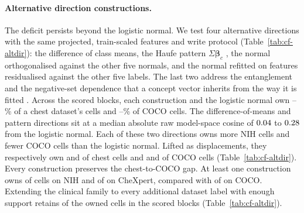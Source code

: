 \paragraph{Alternative direction constructions.} The deficit persists beyond the logistic normal. We test four alternative directions with the same projected, train-scaled features and write protocol (Table~\ref{tab:cf-altdir}): the difference of class means, the Haufe pattern $\Sigma\boldsymbol\beta_c$ \citep{haufe2014interpretation}, the normal orthogonalised against the other five normals, and the normal refitted on features residualised against the other five labels. The last two address the entanglement and the negative-set dependence that a concept vector inherits from the way it is fitted \citep{nicolson2025explaining}. Across the \cfAltdirBlocks{} scored blocks, each construction and the logistic normal own \cfAltdirChestPctMin{}--\cfAltdirChestPctMax\% of a chest dataset's cells and \cfAltdirCocoPctMin{}--\cfAltdirCocoPctMax\% of COCO cells. The difference-of-means and pattern directions sit at a median absolute raw model-space cosine of $0.04$ to $0.28$ from the logistic normal. Each of these two directions owns more NIH cells and fewer COCO cells than the logistic normal. Lifted as displacements, they respectively own \cfAltdirdChestDom{} and \cfAltdirdChestPattern{} of \cfAltdirdChestN{} chest cells and \cfAltdirdCocoDom{} and \cfAltdirdCocoPattern{} of \cfAltdirdCocoN{} COCO cells (Table~\ref{tab:cf-altdir}). Every construction preserves the chest-to-COCO gap. At least one construction owns \cfAltdirNihAny{} of \cfAltdirNihN{} cells on NIH and \cfAltdirChexAny{} of \cfAltdirChexN{} on CheXpert, compared with \cfAltdirCocoAny{} of \cfAltdirCocoN{} on COCO. Extending the clinical family to every additional dataset label with enough support retains \cfExtcompRetained{} of the \cfExtcompOwned{} owned cells in the \cfExtcompBlocks{} scored blocks (Table~\ref{tab:cf-altdir}). 

